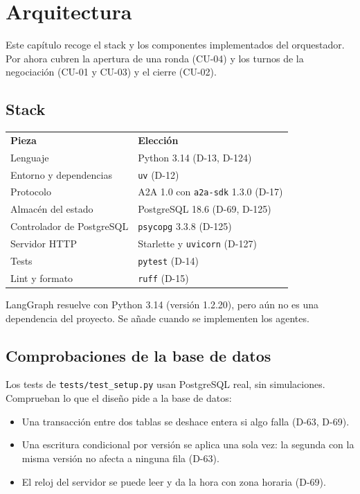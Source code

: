 \chapter{Arquitectura}

Este capítulo recoge el stack y los componentes implementados del orquestador. Por ahora cubren la apertura de una ronda (CU-04) y los turnos de la negociación (CU-01 y CU-03) y el cierre (CU-02).

\section{Stack}

\begin{tabular}{ll}
  \textbf{Pieza} & \textbf{Elección} \\
  Lenguaje & Python 3.14 (D-13, D-124) \\
  Entorno y dependencias & \texttt{uv} (D-12) \\
  Protocolo & A2A 1.0 con \texttt{a2a-sdk} 1.3.0 (D-17) \\
  Almacén del estado & PostgreSQL 18.6 (D-69, D-125) \\
  Controlador de PostgreSQL & \texttt{psycopg} 3.3.8 (D-125) \\
  Servidor HTTP & Starlette y \texttt{uvicorn} (D-127) \\
  Tests & \texttt{pytest} (D-14) \\
  Lint y formato & \texttt{ruff} (D-15) \\
\end{tabular}

LangGraph resuelve con Python 3.14 (versión 1.2.20), pero aún no es una dependencia del proyecto. Se añade cuando se implementen los agentes.

\section{Comprobaciones de la base de datos}

Los tests de \texttt{tests/test\_setup.py} usan PostgreSQL real, sin simulaciones. Comprueban lo que el diseño pide a la base de datos:

\begin{itemize}
  \item Una transacción entre dos tablas se deshace entera si algo falla (D-63, D-69).
  \item Una escritura condicional por versión se aplica una sola vez: la segunda con la misma versión no afecta a ninguna fila (D-63).
  \item El reloj del servidor se puede leer y da la hora con zona horaria (D-69).
\end{itemize}

